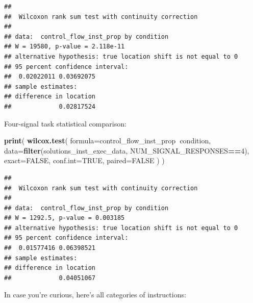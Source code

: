 \documentclass[]{book}
\newenvironment{Shaded}{\begin{snugshade}}{\end{snugshade}}
\newcommand{\DataTypeTok}[1]{\textcolor[rgb]{0.13,0.29,0.53}{#1}}
\newcommand{\DecValTok}[1]{\textcolor[rgb]{0.00,0.00,0.81}{#1}}
\newcommand{\KeywordTok}[1]{\textcolor[rgb]{0.13,0.29,0.53}{\textbf{#1}}}
\newcommand{\NormalTok}[1]{#1}
\newcommand{\OperatorTok}[1]{\textcolor[rgb]{0.81,0.36,0.00}{\textbf{#1}}}
\newcommand{\OtherTok}[1]{\textcolor[rgb]{0.56,0.35,0.01}{#1}}
\begin{document}
\begin{verbatim}
## 
##  Wilcoxon rank sum test with continuity correction
## 
## data:  control_flow_inst_prop by condition
## W = 19580, p-value = 2.118e-11
## alternative hypothesis: true location shift is not equal to 0
## 95 percent confidence interval:
##  0.02022011 0.03692075
## sample estimates:
## difference in location 
##             0.02817524
\end{verbatim}

Four-signal task statistical comparison:

\begin{Shaded}
\begin{Highlighting}[]
\KeywordTok{print}\NormalTok{(}
  \KeywordTok{wilcox.test}\NormalTok{(}
    \DataTypeTok{formula=}\NormalTok{control_flow_inst_prop}\OperatorTok{~}\NormalTok{condition,}
    \DataTypeTok{data=}\KeywordTok{filter}\NormalTok{(solutions_inst_exec_data, NUM_SIGNAL_RESPONSES}\OperatorTok{==}\DecValTok{4}\NormalTok{),}
    \DataTypeTok{exact=}\OtherTok{FALSE}\NormalTok{,}
    \DataTypeTok{conf.int=}\OtherTok{TRUE}\NormalTok{,}
    \DataTypeTok{paired=}\OtherTok{FALSE}
\NormalTok{  )}
\NormalTok{)}
\end{Highlighting}
\end{Shaded}

\begin{verbatim}
## 
##  Wilcoxon rank sum test with continuity correction
## 
## data:  control_flow_inst_prop by condition
## W = 1292.5, p-value = 0.003185
## alternative hypothesis: true location shift is not equal to 0
## 95 percent confidence interval:
##  0.01577416 0.06398521
## sample estimates:
## difference in location 
##             0.04051067
\end{verbatim}

In case you're curious, here's all categories of instructions:
\end{document}
